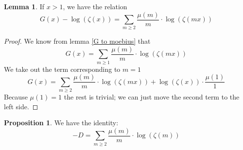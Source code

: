 \documentclass{article}
\theoremstyle{definition}
\newtheorem{lemma}[theorem]{Lemma}
\newtheorem{proposition}[theorem]{Proposition}
\theoremstyle{remark}
\begin{document}
\begin{lemma} \label{prop G - logZeta}
If $x > 1$, we have the relation
$$G(x)-\log(\zeta(x)) = \sum_{m\geq 2} \frac{\mu(m)}{m}\cdot \log(\zeta(mx))$$
\end{lemma}

\begin{proof}
We know from lemma \ref{G to moebius} that
$$G(x)=\sum_{m\geq 1}\frac{\mu(m)}{m}\cdot \log(\zeta(mx))$$
We take out the term corresponding to $m=1$
$$G(x)=\sum_{m\geq 2}\frac{\mu(m)}{m}\cdot \log(\zeta(mx))+\log(\zeta(x))\cdot \frac{\mu(1)}{1}$$
Because $\mu(1)=1$ the rest is trivial; we can just move the second term to the left side.
\end{proof}

\begin{proposition}\label{D-formula}
We have the identity:
$$-D=\sum_{m\geq 2} \frac{\mu(m)}{m}\cdot \log(\zeta(m))$$
\end{proposition}
\end{document}
